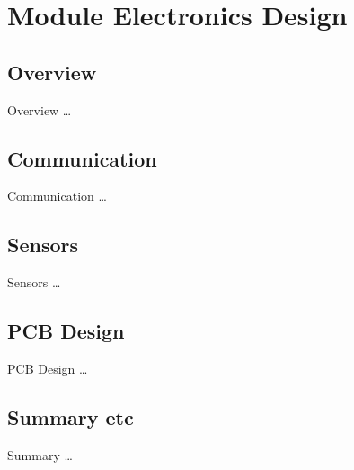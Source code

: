\chapter{Module Electronics Design} \label{Chapter:ModuleElecDesign}

\section{Overview}
Overview \dots

\section{Communication}
Communication \dots

\section{Sensors}
Sensors \dots

\section{PCB Design}
PCB Design \dots

\section{Summary etc}
Summary \dots